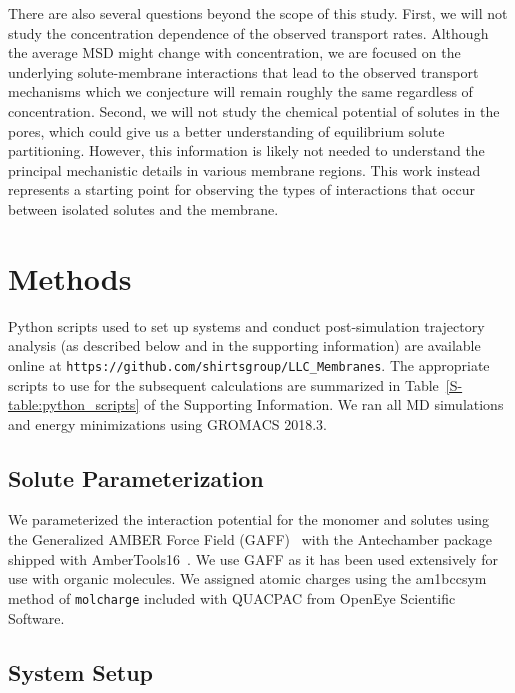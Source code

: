 \documentclass[journal=jpcbfk,manuscript=article]{achemso}
\begin{document}
  There are also several questions beyond the scope of this study.
  First, we will not study the concentration dependence of the observed transport
  rates. Although the average MSD might change with concentration, we are 
  focused on the underlying solute-membrane interactions that lead to the 
  observed transport mechanisms which we conjecture will remain roughly
  the same regardless of concentration. Second, we will not study the chemical potential
  of solutes in the pores, which could give us a better understanding of 
  equilibrium solute partitioning. However, this information is likely
  not needed to understand the principal mechanistic details in various membrane
  regions. This work instead represents a starting point for observing the 
  types of interactions that occur between isolated solutes and the membrane.

  \section{Methods}
  
  Python scripts used to set up systems and conduct post-simulation trajectory 
  analysis (as described below and in the supporting information) are available 
  online at \texttt{https://github.com/shirtsgroup/LLC\_Membranes}. The 
  appropriate scripts to use for the subsequent calculations are summarized in 
  Table~\ref{S-table:python_scripts} of the Supporting Information. We ran all 
  MD simulations and energy minimizations using GROMACS 2018.3.~\cite{bekker_gromacs:_1993,berendsen_gromacs:_1995,van_der_spoel_gromacs:_2005,hess_gromacs_2008} 
  
  \subsection{Solute Parameterization}\label{method:parameterization}
  
  We parameterized the interaction potential for the monomer and solutes using 
  the Generalized AMBER Force Field (GAFF)~\cite{wang_development_2004} with the
  Antechamber package \cite{wang_automatic_2006} shipped with AmberTools16~\cite{case_ambertools16_2016}.
  We use GAFF as it has been used extensively for use with organic molecules.
  We assigned atomic charges using the am1bccsym method of \texttt{molcharge} included
  with QUACPAC from OpenEye Scientific Software.
  
  \subsection{System Setup}\label{method:system_setup}
\end{document}
